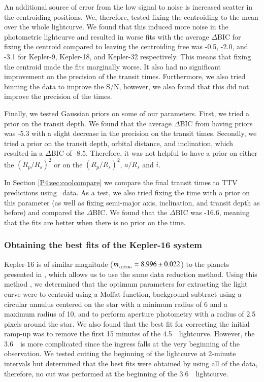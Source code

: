 An additional source of error from the low signal to noise is increased scatter in the centroiding positions. We, therefore, tested fixing the centroiding to the mean over the whole lightcurve. We found that this induced more noise in the photometric lightcurve and resulted in worse fits with the average $\Delta$BIC for fixing the centroid compared to leaving the centroiding free was -0.5, -2.0, and -3.1 for Kepler-9, Kepler-18, and Kepler-32 respectively. This means that fixing the centroid made the fits marginally worse. It also had no significant improvement on the precision of the transit times. Furthermore, we also tried binning the data to improve the S/N, however,  we also found that this did not improve the precision of the times. %

Finally, we tested Gaussian priors on some of our parameters. First, we tried a prior on the transit depth. We found that the average $\Delta$BIC from having priors was -5.3 with a slight decrease in the precision on the transit times. Secondly, we tried a prior on the transit depth, orbital distance, and inclination, which resulted in a $\Delta$BIC of -8.5.  Therefore, it was not helpful to have a prior on either the $(R_p/R_s)^2$ or on the $(R_p/R_s)^2$, $a/R_s$ and $i$.

In Section \ref{P4:sec:coolcompare} we compare the final transit times to TTV predictions using \Kepler~data. As a test, we also tried fixing the time with a prior on this parameter (as well as fixing semi-major axis, inclination, and transit depth as before) and compared the $\Delta$BIC. We found that the $\Delta$BIC was -16.6, meaning that the fits are better when there is no prior on the time.

\subsubsection{Obtaining the best fits of the Kepler-16 system}

Kepler-16 is of similar magnitude ($m_{_{\rm \litl Ks}}=8.996\pm0.022$) to the planets presented in \citet{Baxter2021}, which allows us to use the same data reduction method. Using this method \citep[outlined in ][]{Baxter2021}, we determined that the optimum parameters for extracting the light curve were to centroid using a Moffat function, background subtract using a circular annulus centered on the star with a minimum radius of 6 and a maximum radius of 10, and to perform aperture photometry with a radius of 2.5 pixels around the star. We also found that the best fit for correcting the initial ramp-up was to remove the first 15 minutes of the 4.5~\um~lightcurve. However, the 3.6~\um~is more complicated since the ingress falls at the very beginning of the observation. We tested cutting the beginning of the lightcurve at 2-minute intervals but determined that the best fits were obtained by using all of the data, therefore, no cut was performed at the beginning of the 3.6~\um~lightcurve.

